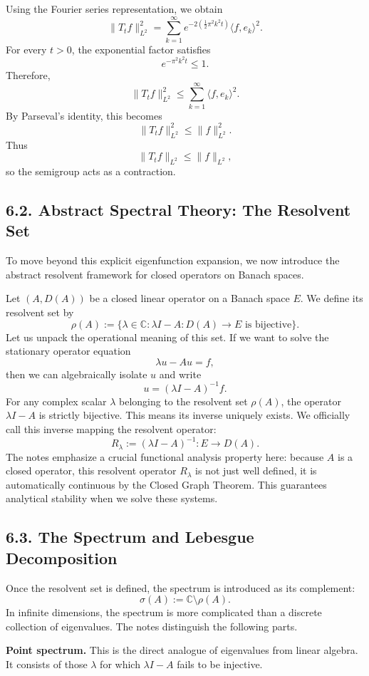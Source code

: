 \documentclass[11pt]{article}
\theoremstyle{definition}
\theoremstyle{remark}
\begin{document}
Using the Fourier series representation, we obtain
\[
\|T_t f\|_{L^2}^2
=
\sum_{k=1}^\infty e^{-2(\frac12\pi^2 k^2 t)}\langle f,e_k\rangle^2.
\]
For every \(t>0\), the exponential factor satisfies
\[
e^{-\pi^2 k^2 t}\le 1.
\]
Therefore,
\[
\|T_t f\|_{L^2}^2
\le
\sum_{k=1}^\infty \langle f,e_k\rangle^2.
\]
By Parseval's identity, this becomes
\[
\|T_t f\|_{L^2}^2
\le
\|f\|_{L^2}^2.
\]
Thus
\[
\|T_t f\|_{L^2}\le \|f\|_{L^2},
\]
so the semigroup acts as a contraction.

\subsection*{6.2. Abstract Spectral Theory: The Resolvent Set}
To move beyond this explicit eigenfunction expansion, we now introduce the abstract resolvent framework for closed operators on Banach spaces.

Let \((A,D(A))\) be a closed linear operator on a Banach space \(E\). We define its resolvent set by
\[
\rho(A):=
\{\lambda\in\mathbb C:\lambda I-A:D(A)\to E \text{ is bijective}\}.
\]
Let us unpack the operational meaning of this set. If we want to solve the stationary operator equation
\[
\lambda u-Au=f,
\]
then we can algebraically isolate \(u\) and write
\[
u=(\lambda I-A)^{-1}f.
\]
For any complex scalar \(\lambda\) belonging to the resolvent set \(\rho(A)\), the operator \(\lambda I-A\) is strictly bijective. This means its inverse uniquely exists. We officially call this inverse mapping the resolvent operator:
\[
R_\lambda:=(\lambda I-A)^{-1}:E\to D(A).
\]
The notes emphasize a crucial functional analysis property here: because \(A\) is a closed operator, this resolvent operator \(R_\lambda\) is not just well defined, it is automatically continuous by the Closed Graph Theorem. This guarantees analytical stability when we solve these systems.

\subsection*{6.3. The Spectrum and Lebesgue Decomposition}
Once the resolvent set is defined, the spectrum is introduced as its complement:
\[
\sigma(A):=\mathbb C\setminus \rho(A).
\]
In infinite dimensions, the spectrum is more complicated than a discrete collection of eigenvalues. The notes distinguish the following parts.

\textbf{Point spectrum.} This is the direct analogue of eigenvalues from linear algebra. It consists of those \(\lambda\) for which \(\lambda I-A\) fails to be injective.
\end{document}
